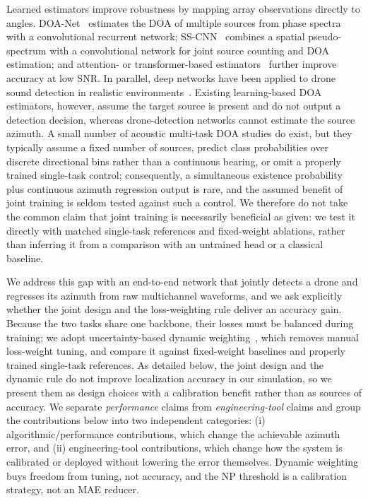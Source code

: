 \documentclass[5p,twocolumn]{elsarticle}
\begin{document}
Learned estimators improve robustness by mapping array observations directly to angles. DOA-Net~\cite{adavanne2018doa} estimates the DOA of multiple sources from phase spectra with a convolutional recurrent network; SS-CNN~\cite{nguyen2020sscnn} combines a spatial pseudo-spectrum with a convolutional network for joint source counting and DOA estimation; and attention- or transformer-based estimators~\cite{vaswani2017attention,wang2024transformer,mack2022attention} further improve accuracy at low SNR. In parallel, deep networks have been applied to drone sound detection in realistic environments~\cite{jeon2017drone,kim2017uav}. Existing learning-based DOA estimators, however, assume the target source is present and do not output a detection decision, whereas drone-detection networks cannot estimate the source azimuth. A small number of acoustic multi-task DOA studies do exist, but they typically assume a fixed number of sources, predict class probabilities over discrete directional bins rather than a continuous bearing, or omit a properly trained single-task control; consequently, a simultaneous existence probability plus continuous azimuth regression output is rare, and the assumed benefit of joint training is seldom tested against such a control. We therefore do not take the common claim that joint training is necessarily beneficial as given: we test it directly with matched single-task references and fixed-weight ablations, rather than inferring it from a comparison with an untrained head or a classical baseline.

We address this gap with an end-to-end network that jointly detects a drone and regresses its azimuth from raw multichannel waveforms, and we ask explicitly whether the joint design and the loss-weighting rule deliver an accuracy gain. Because the two tasks share one backbone, their losses must be balanced during training; we adopt uncertainty-based dynamic weighting~\cite{kendall2018mtl}, which removes manual loss-weight tuning, and compare it against fixed-weight baselines and properly trained single-task references. As detailed below, the joint design and the dynamic rule do not improve localization accuracy in our simulation, so we present them as design choices with a calibration benefit rather than as sources of accuracy. We separate \emph{performance} claims from \emph{engineering-tool} claims and group the contributions below into two independent categories: (i) algorithmic/performance contributions, which change the achievable azimuth error, and (ii) engineering-tool contributions, which change how the system is calibrated or deployed without lowering the error themselves. Dynamic weighting buys freedom from tuning, not accuracy, and the NP threshold is a calibration strategy, not an MAE reducer.
\end{document}
